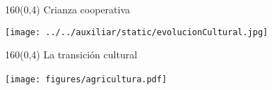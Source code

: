 \documentclass[shownotes,aspectratio=169]{beamer}
\newif\ifen
\newif\ifes
\newcommand{\en}[1]{\ifen#1\fi}
\newcommand{\es}[1]{\ifes#1\fi}
\begin{document}
% 
% 
% 

\begin{frame}[plain]
\begin{textblock}{160}(0,4)
 \centering \LARGE
Crianza cooperativa
\end{textblock}
\vspace{1cm}

\texttt{[image: ../../auxiliar/static/evolucionCultural.jpg]}

\end{frame}


\begin{frame}[plain]
\begin{textblock}{160}(0,4)
 \centering \LARGE
La transición cultural
\end{textblock}
\vspace{0.3cm}

\centering
\texttt{[image: figures/agricultura.pdf]} \ \ \ \ \ 

\end{frame}
\end{document}
